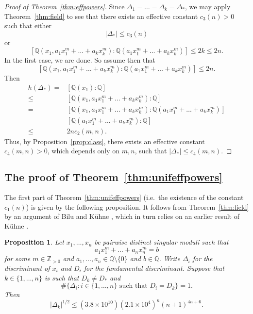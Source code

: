 \documentclass[11pt,a4paper, british]{amsart}
\newtheorem{prop}[thm]{Proposition}
\theoremstyle{definition}
\theoremstyle{remark}
\numberwithin{equation}{section}
\newcommand{\Q}{\mathbb{Q}} %
\newcommand{\Z}{\mathbb{Z}} %
\begin{document}
\begin{proof}[Proof of Theorem~\ref{thm:effpowers}]
	Since $\Delta_1 = \ldots = \Delta_k = \Delta_*$, we may apply Theorem~\ref{thm:field} to see that there exists an effective constant $c_3(n)>0$ such that either
	\[ \lvert \Delta_* \rvert \leq c_3(n)\]
	or
	\[ [\Q(x_1, a_1 x_1^m + \ldots + a_k x_k^m) : \Q(a_1 x_1^m + \ldots + a_k x_k^m)] \leq 2k \leq 2n.\]
	In the first case, we are done. So assume then that
	\[ [\Q(x_1, a_1 x_1^m + \ldots + a_k x_k^m) : \Q(a_1 x_1^m + \ldots + a_k x_k^m)] \leq 2n.\]
	Then
	\begin{align*} 
		h(\Delta_*) =	&[\Q(x_1) : \Q]\\
		\leq &[\Q(x_1, a_1 x_1^m + \ldots + a_k x_k^m) : \Q]\\
		= &[\Q(x_1, a_1 x_1^m + \ldots + a_k x_k^m) : \Q(a_1 x_1^m + \ldots + a_k x_k^m)]\\
		&[\Q(a_1 x_1^m + \ldots + a_k x_k^m) : \Q]\\
		\leq &2n c_2(m, n).
	\end{align*}
	Thus, by Proposition~\ref{prop:class}, there exists an effective constant $c_4(m, n) > 0$, which depends only on $m, n$, such that $\lvert \Delta_* \rvert \leq c_4(m, n)$. 
\end{proof}





\subsection{The proof of Theorem~\ref{thm:unifeffpowers}}\label{subsec:unipf}

The first part of Theorem~\ref{thm:unifeffpowers} (i.e.~the existence of the constant $c_1(n)$) is given by the following proposition. It follows from Theorem~\ref{thm:field} by an argument of Bilu and K\"uhne \cite[\S3, Step 4]{BiluKuhne20}, which in turn relies on an earlier result of K\"uhne \cite[Corollary~1.2]{Kuhne21}.

\begin{prop}\label{prop:step4}
	Let $x_1, \ldots, x_n$ be pairwise distinct singular moduli such that
	\[ a_1 x_1^m + \ldots + a_n x_n^m = b\]
	for some $m \in \Z_{>0}$ and $a_1, \ldots, a_n \in \Q \setminus \{0\}$ and $b \in \Q$.
	Write $\Delta_i$ for the discriminant of $x_i$ and $D_i$ for the fundamental discriminant. 
	Suppose that $k \in \{1, \ldots, n\}$ is such that $D_k \neq D_*$ and
	\[ \# \{\Delta_i : i \in \{1, \ldots, n\} \mbox{ such that } D_i = D_k\} = 1.\] 
	Then
	\[ \lvert \Delta_k \rvert^{1/2} \leq (3.8 \times 10^{10})(2.1 \times 10^4)^n (n+1)^{4n+6}.\]
\end{prop}
\end{document}
